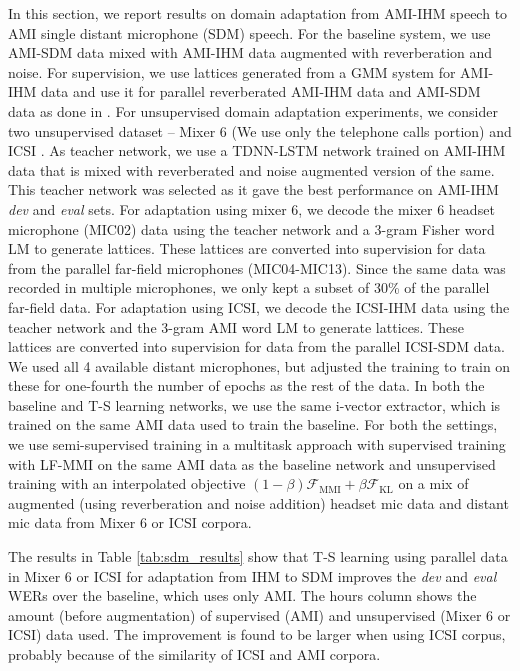 \documentclass{article}
\newcommand{\Fkl}{\mathcal{F}_\text{KL}}
\newcommand{\Fmmi}{\mathcal{F}_\text{MMI}}
\begin{document}
In this section, we report results on domain adaptation from AMI-IHM speech to AMI single distant microphone (SDM) speech.
For the baseline system, we use AMI-SDM data mixed with AMI-IHM data 
augmented with reverberation and noise. For supervision, we use lattices
generated from a GMM system for AMI-IHM data and use it for parallel
reverberated AMI-IHM data and AMI-SDM data as done in \cite{vijay_ami}.
For unsupervised domain adaptation experiments, we consider two unsupervised
dataset -- Mixer 6 \cite{mixer6-corpus} (We use only the telephone calls
portion) and ICSI \cite{icsi-corpus}. 
As teacher network, we use a TDNN-LSTM network trained on AMI-IHM data
that is mixed with reverberated and noise augmented version of the same. This
teacher network was selected as it gave the best performance on
AMI-IHM {\em dev} and {\em eval} sets. 
For adaptation using mixer 6, we decode the mixer 6 headset microphone
(MIC02) data using the teacher network
and a 3-gram Fisher word LM to generate
lattices. These lattices are converted into supervision for data from 
the parallel far-field microphones (MIC04-MIC13). Since the same data was 
recorded in multiple microphones, we only kept a subset of 30\% of the parallel
far-field data. 
For adaptation using ICSI, we decode the ICSI-IHM data using the teacher network
and the 3-gram AMI word LM to generate lattices. These lattices are converted 
into supervision for data from the parallel ICSI-SDM data. We used all 4
available distant microphones, but adjusted the training to train on these for
one-fourth the number of epochs as the rest of the data. In both the baseline
and T-S learning networks, we use the same i-vector extractor, 
which is trained on the same AMI data used to train the baseline. For both the
settings, we use semi-supervised training in a multitask approach
with supervised training with LF-MMI on the same AMI data as the baseline network
and unsupervised training with an interpolated objective
$(1-\beta)\Fmmi+\beta\Fkl$ on a mix of augmented (using reverberation and noise
addition) headset mic data and distant mic data from Mixer 6 or ICSI corpora.

The results in Table \ref{tab:sdm_results} show that T-S learning using 
parallel data in Mixer 6 or ICSI for adaptation from IHM to SDM improves the {\em dev} and {\em eval}
WERs  over the baseline, which uses only AMI. The hours column shows the amount (before augmentation) of 
supervised (AMI) and unsupervised (Mixer 6 or ICSI) data used. The improvement is found to be
larger when using ICSI corpus, probably because of the similarity of ICSI and
AMI corpora. 
\end{document}

